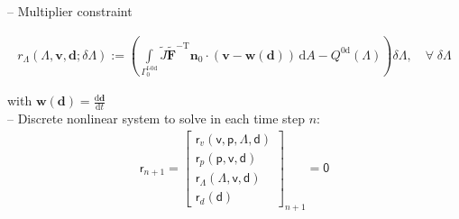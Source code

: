\documentclass[a4paper,12pt]{report}
\newcommand{\fF}{\text{f}}
\newcommand{\bs}[1]{\boldsymbol{#1}}
\newcommand{\Gm}{\mathit{\Gamma}}
\newcommand{\ROP}{\bs{\mathsf{r}}}
\newcommand{\LMZ}{\bs{\mathsf{\Lambda}}}
\begin{document}
-- Multiplier constraint

\begin{equation}
\begin{aligned}
r_{\mathit{\Lambda}}(\mathit{\Lambda},\bs{v},\bs{d};\delta\mathit{\Lambda}):= \left(\int\limits_{\Gm_0^{\mathrm{\fF\text{-}0d}}}\! \widetilde{J}\widetilde{\bs{F}}^{-\mathrm{T}}\bs{n}_{0}\cdot(\bs{v}-\bs{w}(\bs{d}))\,\mathrm{d}A - Q^{\mathrm{0d}}(\mathit{\Lambda})\right) \delta\mathit{\Lambda}, \quad \forall \; \delta\mathit{\Lambda}
\end{aligned}
\end{equation}

with $\bs{w}(\bs{d})=\frac{\mathrm{d}\bs{d}}{\mathrm{d}t}$\\

-- Discrete nonlinear system to solve in each time step $n$:
\begin{equation}
\label{equation-nonlin-sys-fluid-ale-0d}
\begin{aligned}
\ROP_{n+1} = \begin{bmatrix} \ROP_{v}(\bs{\mathsf{v}},\bs{\mathsf{p}},\LMZ,\bs{\mathsf{d}}) \\ \ROP_{p}(\bs{\mathsf{p}},\bs{\mathsf{v}},\bs{\mathsf{d}}) \\ \ROP_{\mathit{\Lambda}}(\LMZ,\bs{\mathsf{v}},\bs{\mathsf{d}}) \\ \ROP_{d}(\bs{\mathsf{d}}) \end{bmatrix}_{n+1} = \bs{\mathsf{0}}
\end{aligned}
\end{equation}
\end{document}
